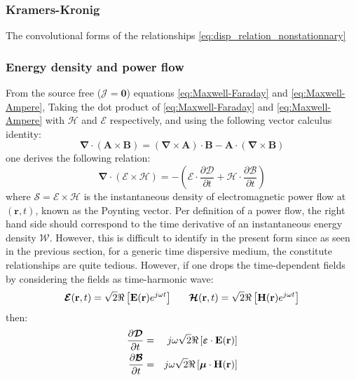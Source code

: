 \subsubsection{Kramers-Kronig}
The convolutional forms of the relationships \ref{eq:disp_relation_nonstationnary}

\subsubsection{Energy density and power flow}
\parencite[p.78]{Felsen1994}

From the source free ($\boldsymbol{\mathcal{J}}=\boldsymbol{0}$) equations \ref{eq:Maxwell-Faraday} and \ref{eq:Maxwell-Ampere}, Taking the dot product of \ref{eq:Maxwell-Faraday} and \ref{eq:Maxwell-Ampere} with $\boldsymbol{\mathcal{H}}$  and $\boldsymbol{\mathcal{E}}$ respectively, and using the following vector calculus identity:
$$
\boldsymbol{\nabla}\cdot (\mathbf{A} \times \mathbf{B})
=
(\boldsymbol{\nabla} \times \mathbf{A})\cdot\mathbf{B} - \mathbf{A}\cdot (\boldsymbol{\nabla}\times \mathbf{B})
$$
one derives the following relation:
\begin{equation}
\boldsymbol{\nabla}\cdot(\boldsymbol{\mathcal{E}}\times\boldsymbol{\mathcal{H}})
=
- \left(
\boldsymbol{\mathcal{E}}\cdot\frac{\partial \boldsymbol{\mathcal{D}}}{\partial t}
+
\boldsymbol{\mathcal{H}}\cdot\frac{\partial \boldsymbol{\mathcal{B}}}{\partial t}
\right)
\label{eq:poynting_theorem_without_source}
\end{equation}
where $\boldsymbol{\mathcal{S}}=\boldsymbol{\mathcal{E}}\times\boldsymbol{\mathcal{H}}$ is the instantaneous density of electromagnetic power flow at $(\mathbf{r},t)$, known as the Poynting vector. Per definition of a power flow, the right hand side should correspond to the time derivative of an instantaneous energy density $\mathcal{W}$. However, this is difficult to identify in the present form since as seen in the previous section, for a generic time dispersive medium, the constitute relationships are quite tedious. However, if one drops the time-dependent fields by considering the fields as time-harmonic wave:
$$
\boldsymbol{\mathcal{E}}(\mathbf{r},t) = \sqrt{2} \Re\left[\mathbf{E}(\mathbf{r}) e^{j\omega t}\right]
\;\;\;\;\;\;
\boldsymbol{\mathcal{H}}(\mathbf{r},t) = \sqrt{2} \Re\left[\mathbf{H}(\mathbf{r}) e^{j\omega t}\right]
$$
then:
\begin{eqnarray}
\frac{\partial \boldsymbol{\mathcal{D}}}{\partial t} 
&=& 
j\omega \sqrt{2} \Re\left[\boldsymbol{\varepsilon} \cdot \mathbf{E}(\mathbf{r})\right]
\\
\frac{\partial \boldsymbol{\mathcal{B}}}{\partial t} 
&=& 
j\omega \sqrt{2} \Re\left[\boldsymbol{\mu} \cdot \mathbf{H}(\mathbf{r})\right]
\end{eqnarray}

